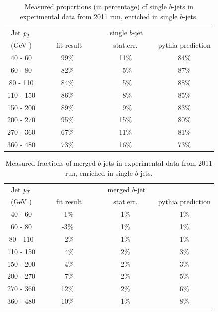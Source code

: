 \begin{table}[!hbt] %
\renewcommand{\arraystretch}{1.2}
\centering
\begin{tabular}{ | c || c | c | c ||}
  \hline
  Jet ${\emph{p}_{T}}$ & \multicolumn{3}{c||}{single $b$-jet}\\ \cline{2-4}
    (GeV ) & ~~~~fit result~~~ & ~~~~stat.err.~~~~ & pythia prediction \\ \hline
   40 - 60 &  99\%  &  11\%  &  84\% \\  
   60 - 80 &  82\%  &  ~5\%  &  87\% \\ 
   80 - 110&  84\%  &  ~5\%  &  88\% \\ 
  110 - 150&  86\%  &  ~8\%  &  85\% \\ 
  150 - 200&  89\%  &  ~9\%  &  83\% \\ 
  200 - 270&  95\%  &  15\%  &  80\% \\ 
  270 - 360&  67\%  &  11\%  &  81\% \\ 
  360 - 480&  73\%  &  16\%  &  73\% \\ \hline
\end{tabular}
\caption{Measured proportions (in percentage) of single $b$-jets in experimental data from 2011 run, enriched in single $b$-jets.}
\label{tb:fitfractions2btagS}
\end{table}

\begin{table}[!hbt] %
\renewcommand{\arraystretch}{1.2}
\centering
\begin{tabular}{ | c || c | c | c ||}
  \hline
  Jet ${\emph{p}_{T}}$ & \multicolumn{3}{c||}{merged $b$-jet}\\ \cline{2-4}
    (GeV ) & ~~~~fit result~~~ & ~~~~stat.err.~~~~ & pythia prediction \\ \hline
   40 - 60 &  -1\%  &  1\%  &  1\% \\  
   60 - 80 &  -3\%  &  1\%  &  1\% \\ 
   80 - 110&  ~2\%  &  1\%  &  1\% \\ 
  110 - 150&  ~4\%  &  2\%  &  3\% \\ 
  150 - 200&  ~4\%  &  2\%  &  3\% \\ 
  200 - 270&  ~7\%  &  2\%  &  5\% \\ 
  270 - 360&  12\%  &  2\%  &  6\% \\ 
  360 - 480&  10\%  &  1\%  &  8\% \\ \hline
\end{tabular}
\caption{Measured fractions of merged $b$-jets in experimental data from 2011 run, enriched in single $b$-jets.}
\label{tb:fitfractions2btagM}
\end{table}

